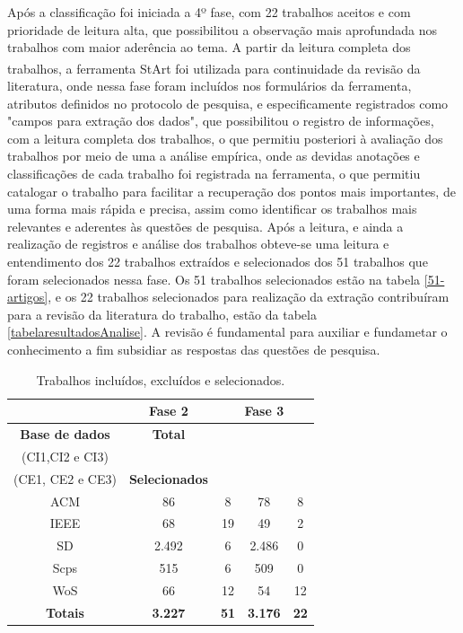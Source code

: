 Após a classificação foi iniciada a 4º fase, com 22 trabalhos aceitos e com prioridade de leitura alta, que possibilitou a observação mais aprofundada nos trabalhos com maior aderência ao tema. A partir da leitura completa dos trabalhos, a ferramenta \acrshort{StArt}\textsuperscript{\textregistered} foi utilizada para continuidade da revisão da literatura, onde nessa fase foram incluídos nos formulários da ferramenta, atributos definidos no protocolo de pesquisa, e especificamente registrados como "campos para extração dos dados", que possibilitou o registro de informações, com a leitura completa dos trabalhos, o  que permitiu posteriori à avaliação dos trabalhos por meio de uma a análise empírica, onde as devidas anotações e classificações de cada trabalho foi registrada na ferramenta, o que permitiu catalogar o trabalho para facilitar a recuperação dos pontos mais importantes, de uma forma mais rápida e precisa, assim como identificar os trabalhos mais relevantes e aderentes às questões de pesquisa. Após a leitura, e ainda a realização de registros e análise dos trabalhos obteve-se uma leitura e entendimento dos 22 trabalhos extraídos e selecionados dos 51 trabalhos que foram selecionados nessa fase. Os 51 trabalhos selecionados estão na tabela \ref{51-artigos}, e os 22 trabalhos selecionados para  realização da extração contribuíram para a revisão da literatura do trabalho, estão da tabela \ref{tabelaresultadosAnalise}. A revisão é fundamental para auxiliar e fundametar o conhecimento a fim subsidiar as respostas das questões de pesquisa. 

\begin{longtable}{c|c|c|c|c|}
\caption{Trabalhos incluídos, excluídos e selecionados.}
\label{tab:fase-revisao-literatura}\\
\cline{2-5}
 & \textbf{Fase 2} & \multicolumn{3}{c|}{\textbf{Fase 3}} \\ \hline
\endfirsthead
%
\endhead
%
\multicolumn{1}{|c|}{\textbf{Base de dados}} & \textbf{Total} & \textbf{\begin{tabular}[c]{@{}c@{}}Incluídos\\ (CI1,CI2 e CI3)\end{tabular}} & \textbf{\begin{tabular}[c]{@{}c@{}}Excluídos\\ (CE1, CE2 e CE3)\end{tabular}} & \textbf{Selecionados} \\ \hline
\multicolumn{1}{|c|}{\acrlong{ACM}} & 86 & 8 & 78 & 8 \\ \hline
\multicolumn{1}{|c|}{\acrlong{IEEE}} & 68 & 19 & 49 & 2 \\ \hline
\multicolumn{1}{|c|}{\acrlong{SD}} & 2.492 & 6 & 2.486 & 0 \\ \hline
\multicolumn{1}{|c|}{\acrlong{Scps}} & 515 & 6 & 509 & 0 \\ \hline
\multicolumn{1}{|c|}{\acrlong{WoS}} & 66 & 12 & 54 & 12 \\ \hline
\multicolumn{1}{|c|}{\textbf{Totais}} & \textbf{‭3.227‬} & \textbf{51} & \textbf{3.176} & \textbf{22} \\ \hline
\end{longtable}


